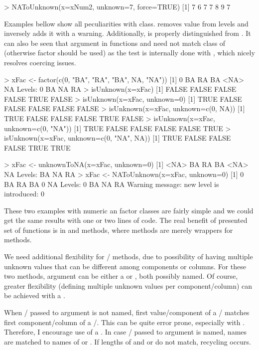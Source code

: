 \documentclass[a4paper]{report}
\begin{document}
\begin{article}
\begin{smallverbatim}
> NAToUnknown(x=xNum2, unknown=7, force=TRUE)
[1] 7 6 7 7 8 9 7
\end{smallverbatim}

Examples bellow show all peculiarities with  class.
 removes  value from levels and inversely
 adds it with a warning. Additionally,  is
properly distinguished from . It can also be seen that argument
 in functions  and  need
not match class of  (otherwise factor should be used) as the test
is internally done with , which nicely resolves coercing
issues.

\begin{smallverbatim}
> xFac <- factor(c(0, "BA", "RA", "BA", NA, "NA"))
[1] 0    BA   RA   BA   <NA> NA
Levels: 0 BA NA RA
> isUnknown(x=xFac)
[1] FALSE FALSE FALSE FALSE  TRUE FALSE
> isUnknown(x=xFac, unknown=0)
[1]  TRUE FALSE FALSE FALSE FALSE FALSE
> isUnknown(x=xFac, unknown=c(0, NA))
[1]  TRUE FALSE FALSE FALSE  TRUE FALSE
> isUnknown(x=xFac, unknown=c(0, "NA"))
[1]  TRUE FALSE FALSE FALSE FALSE  TRUE
> isUnknown(x=xFac, unknown=c(0, "NA", NA))
[1]  TRUE FALSE FALSE FALSE  TRUE  TRUE

> xFac <- unknownToNA(x=xFac, unknown=0)
[1] <NA> BA   RA   BA   <NA> NA
Levels: BA NA RA
> xFac <- NAToUnknown(x=xFac, unknown=0)
[1] 0  BA RA BA 0  NA
Levels: 0 BA NA RA
Warning message:
new level is introduced: 0
\end{smallverbatim}

These two examples with numeric an factor classes are fairly simple and we
could get the same results with one or two lines of \R{} code. The real
benefit of presented set of functions is in  and
 methods, where  methods are merely
wrappers for  methods.

We need additional flexibility for / methods,
due to possibility of having multiple unknown values that can be different
among  components or  columns. For these two
methods, argument  can be either a  or
, both possibly named. Of course, greater flexibility (defining
multiple unknown values per component/column) can be achieved with
a .

When / passed to argument  is not
named, first value/component of a / matches first
component/column of a /. This can be quite
error prone, especially with . Therefore, I encourage use of
a . In case / passed to argument
 is named, names are matched to names of  or
. If lengths of  and  or
 do not match, recycling occurs.


\end{article}
\end{document}
